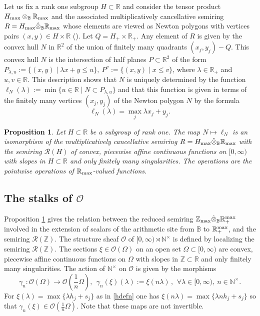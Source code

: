 \documentclass{elsart3-1}
\newtheorem{e-proposition}[theorem]{Proposition}
\def\B{{\mathbb B}}
\def\N{{\mathbb N}}
\def\R{{\mathbb R}}
\def\Z{{\mathbb Z}}
\def\cO{{\mathcal O}}
\def\cR{{\mathcal R}}
\def\qqq{\,,\,~\forall}
\def\mc{multiplicatively cancellative }
\def\zmax{{\Z_{\rm max}}}
\def\rmax{\R_+^{\rm max}}
\def\rma{\R_{\rm max}}
\def\nt{\N^{\times}}
\def\rnt{{[0,\infty)\rtimes{\N^{\times}}}}
\def\vsp{\vspace{.05in}}
\begin{document}
Let us fix a rank one subgroup $H\subset \R$ and consider the tensor product 
$H_{\rm max}\otimes_\B\rma$ and the associated \mc semiring $R=H_{\rm max}\hat \otimes_\B\rma$ 
whose elements are viewed as Newton polygons with vertices  pairs $(x,y)\in H\times \R$ (\!\!\cite{CC1}). Let $Q=H_+\times \R_+$. Any element of $R$ is given by the convex hull $N$ in $\R^2$ of the union of finitely many quadrants $(x_j,y_j)-Q$. This convex hull $N$ is the intersection of half planes $P\subset \R^2$  of the form
$
P_{\lambda,u}:=\{(x,y)\mid \lambda x+y\leq u\}, \  P^v:=\{(x,y)\mid x\leq v\}
$, where $\lambda \in \R_+$ and $u,v\in\R$.
This description shows that $N$ is uniquely determined by the function 
$
\ell_N(\lambda):=\min \{u\in\R\mid N\subset P_{\lambda,u}\}
$
and that this function is given in terms of the finitely many vertices $(x_j,y_j)$ of the Newton polygon $N$ by the formula 
\begin{equation}\label{hdefn}
\ell_N(\lambda)=\max_j \lambda x_j+y_j.
\end{equation}

\begin{e-proposition} \label{legendrelem} Let $H\subset \R$ be a subgroup of rank one.
The map $N\mapsto \ell_N$ is an isomorphism of the \mc semiring $R=H_{\rm max}\hat\otimes_\B\rma$ with the semiring $\cR(H)$ of convex, piecewise affine continuous functions on 
$[0,\infty)$ with slopes in $H\subset \R$ and only finitely many singularities. The operations are the pointwise 
operations of $\rma$-valued functions.
\end{e-proposition}

\vspace*{-.3cm}
\subsection{The stalks of $\cO$}
\vspace*{-.3cm}


Proposition  \ref{legendrelem} gives the relation between the reduced semiring $\zmax\hat\otimes_\B\rmax$  involved in the extension of scalars of the arithmetic site from $\B$ to $\rmax$, and the semiring $\cR(\Z)$.
The structure sheaf $\cO$ of $\rnt$ is defined by localizing the semiring $\cR(\Z)$. The sections $\xi \in \cO(\Omega)$ on an open set $\Omega\subset [0,\infty)$ are convex, piecewise affine continuous functions on 
$\Omega$ with slopes in $\Z\subset \R$ and only finitely many singularities. The action of $\nt$ on $\cO$  is given by the morphisms 
\begin{equation}\label{gammar}
\gamma_n:\cO(\Omega)\to \cO(\frac 1n\Omega), \  \   \gamma_n(\xi)(\lambda):=\xi(n\lambda)\qqq \lambda \in [0,\infty), \  n\in \nt.
\end{equation}
For $\xi(\lambda)=\max\{\lambda h_j+s_j\}$ as in \eqref{hdefn} one has $\xi(n\lambda)=\max\{\lambda n h_j+s_j\}$ so that $\gamma_n(\xi)\in \cO(\frac 1n\Omega)$. Note that these maps are not invertible. \vsp
\end{document}
